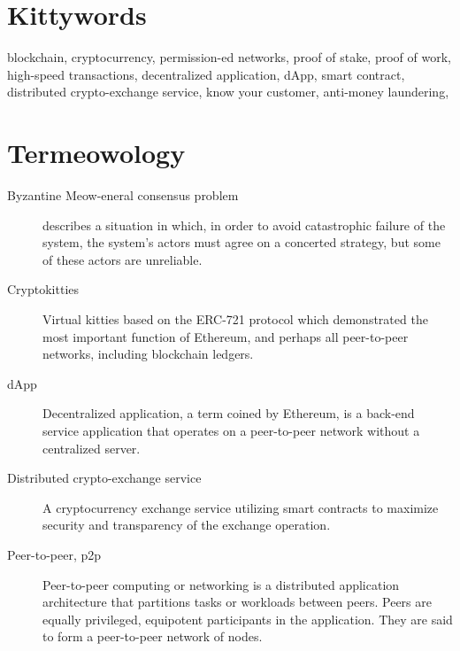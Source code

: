 \documentclass[9pt,oneside]{amsart}
\begin{document}
\setlength{\columnsep}{20pt}
\begin{multicols}{2}


\section{Kittywords}\label{sec:keywords} {blockchain, cryptocurrency, permission-ed networks, proof of stake, proof of work, high-speed transactions, decentralized application, dApp, smart contract, distributed crypto-exchange service}, know your customer, anti-money laundering, \meow{}

\section{Termeowology}\label{sec:terminology}
\begin{description}
    
    \item[Byzantine Meow-eneral consensus problem] describes a situation in which, in order to avoid catastrophic failure of the system, the system's actors must agree on a concerted strategy, but some of these actors are unreliable.
    
    \item[Cryptokitties] Virtual kitties based on the ERC-721 protocol which demonstrated the most important function of Ethereum, and perhaps all peer-to-peer networks, including blockchain ledgers.
    
    \item[dApp] Decentralized application, a term coined by Ethereum, is a back-end service application that operates on a peer-to-peer network without a centralized server.
    
    \item[Distributed crypto-exchange service] A cryptocurrency exchange service utilizing smart contracts to maximize security and transparency of the exchange operation.
    
    \item[Peer-to-peer, p2p] Peer-to-peer computing or networking is a distributed application architecture that partitions tasks or workloads between peers. Peers are equally privileged, equipotent participants in the application. They are said to form a peer-to-peer network of nodes.
    

\end{description}
\end{multicols}
\end{document}
